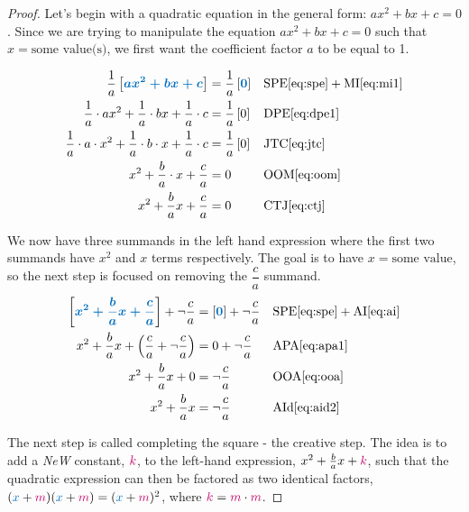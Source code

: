 \documentclass[20150903-160354-rs2.2-MarksMathNotebook.tex]{subfiles}
\begin{document}
\begin{proof}

Let's begin with a quadratic equation in the general form: $ax^2+bx+c=0$.  Since we are trying to manipulate the equation  $ax^2+bx+c=0$ such that $x=\text{some value(s)}$, we first want the coefficient factor $a$ to be equal to 1.

\begin{align*}
\dfrac{1}{a} \farg{ax^2 + bx +c} & = \dfrac{1}{a} \farg{0} && \text{SPE} \eqref{eq:spe} + \text{MI} \eqref{eq:mi1} \\
\dfrac{1}{a} \cdot ax^2 + \dfrac{1}{a} \cdot bx + \dfrac{1}{a} \cdot c  & = \dfrac{1}{a} \left[ 0\right] && \text{DPE} \eqref{eq:dpe1} \\
\dfrac{1}{a} \cdot a \cdot x^2 + \dfrac{1}{a} \cdot b \cdot x + \dfrac{1}{a} \cdot c  & = \dfrac{1}{a} \left[ 0\right] && \text{JTC} \eqref{eq:jtc} \\
x^2 + \dfrac{b}{a} \cdot x + \dfrac{c}{a} & = 0 && \text{OOM} \eqref{eq:oom} \\
x^2 +\dfrac{b}{a}x + \dfrac{c}{a}  & = 0 && \text{CTJ} \eqref{eq:ctj}
\end{align*}

We now have three summands in the left hand expression where the first two summands have $x^2$ and $x$ terms respectively.  The goal is to have $x=\text{some value}$, so the next step is focused on removing the  $\dfrac{c}{a}$ summand.\\

\begin{align*}
\farg{x^2 +\dfrac{b}{a}x + \dfrac{c}{a}}  + \neg \dfrac{c}{a}  & = \farg{ 0 } + \neg \dfrac{c}{a} &&  \text{SPE} \eqref{eq:spe} + \text{AI} \eqref{eq:ai} \\
x^2 +\dfrac{b}{a}x + \left(\dfrac{c}{a} + \neg \dfrac{c}{a} \right)  & = 0  + \neg \dfrac{c}{a} && \text{APA} \eqref{eq:apa1} \\
x^2 +\dfrac{b}{a}x + 0 & = \neg \dfrac{c}{a} && \text{OOA} \eqref{eq:ooa} \\
x^2 +\dfrac{b}{a}x & = \neg \dfrac{c}{a} && \text{AId} \eqref{eq:aid2} 
\end{align*}

The next step is called completing the square - the creative step.  The idea is to add a \textit{NeW} constant, $\color{sthlmRed}k$, to the left-hand expression, $x^2 +\frac{b}{a}x+\color{sthlmRed}k$,  such that the quadratic expression can then be factored as two identical factors, $({\color{sthlmBlue}x}+{\color{sthlmRed}m})({\color{sthlmBlue}x}+{\color{sthlmRed}m}) = ({\color{sthlmBlue}x}+{\color{sthlmRed}m})^2$, where  ${{\color{sthlmRed}k}=\color{sthlmRed}m} \cdot {\color{sthlmRed}m}$.  


\end{proof}
\end{document}
